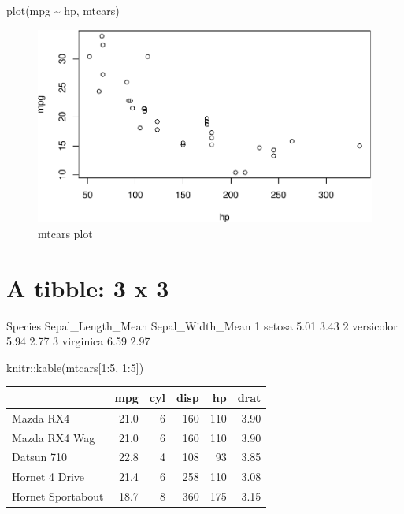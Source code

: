 \documentclass[12pt, a4paper]{report} %
\newenvironment{Shaded}{\begin{snugshade}}{\end{snugshade}}
\newcommand{\DecValTok}[1]{\textcolor[rgb]{0.00,0.00,0.81}{#1}}
\newcommand{\FunctionTok}[1]{\textcolor[rgb]{0.00,0.00,0.00}{#1}}
\newcommand{\NormalTok}[1]{#1}
\newcommand{\SpecialCharTok}[1]{\textcolor[rgb]{0.00,0.00,0.00}{#1}}
\begin{document}
\begin{Shaded}
\begin{Highlighting}[]
\FunctionTok{plot}\NormalTok{(mpg }\SpecialCharTok{\textasciitilde{}}\NormalTok{ hp, mtcars)}
\end{Highlighting}
\end{Shaded}

\begin{figure}
\centering
\includegraphics{skeleton_files/figure-latex/mtcars-1.pdf}
\caption{mtcars plot}
\end{figure}

\hypertarget{a-tibble-3-x-3}{%
\section{A tibble: 3 x 3}\label{a-tibble-3-x-3}}

Species Sepal\_Length\_Mean Sepal\_Width\_Mean 1 setosa 5.01 3.43 2
versicolor 5.94 2.77 3 virginica 6.59 2.97

\begin{Shaded}
\begin{Highlighting}[]
\NormalTok{knitr}\SpecialCharTok{::}\FunctionTok{kable}\NormalTok{(mtcars[}\DecValTok{1}\SpecialCharTok{:}\DecValTok{5}\NormalTok{, }\DecValTok{1}\SpecialCharTok{:}\DecValTok{5}\NormalTok{])}
\end{Highlighting}
\end{Shaded}

\begin{longtable}[]{@{}lrrrrr@{}}
\toprule
& mpg & cyl & disp & hp & drat \\
\midrule
\endhead
Mazda RX4 & 21.0 & 6 & 160 & 110 & 3.90 \\
Mazda RX4 Wag & 21.0 & 6 & 160 & 110 & 3.90 \\
Datsun 710 & 22.8 & 4 & 108 & 93 & 3.85 \\
Hornet 4 Drive & 21.4 & 6 & 258 & 110 & 3.08 \\
Hornet Sportabout & 18.7 & 8 & 360 & 175 & 3.15 \\
\bottomrule
\end{longtable}
\end{document}

